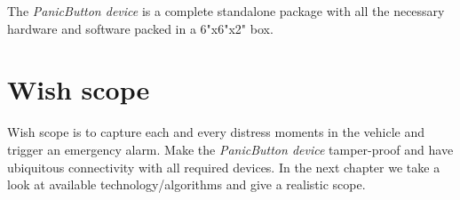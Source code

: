 The \emph{PanicButton device} is a complete standalone package with all the necessary hardware and software packed in a 6"x6"x2" box.



\section{Wish scope}
Wish scope is to capture each and every distress moments in the vehicle and trigger an emergency alarm. Make the \emph{PanicButton device} tamper-proof and have ubiquitous connectivity with all required devices. In the next chapter we take a look at available technology/algorithms and give a realistic scope.
